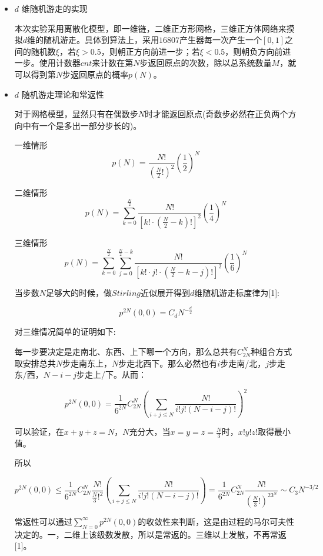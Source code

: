 \documentclass[UTF8]{ctexart}
\begin{document}
	\begin{itemize}
		\item $d$ 维随机游走的实现
		
		本次实验采用离散化模型，即一维链，二维正方形网格，三维正方体网络来摸拟$d$维的随机游走。具体到算法上，采用$16807$产生器每一次产生一个$[0,1]$之间的随机数$\xi$，若$\xi>0.5$，则朝正方向前进一步；若$\xi<0.5$，则朝负方向前进一步。使用计数器$cnt$来计数在第$N$步返回原点的次数，除以总系统数量$M$，就可以得到第$N$步返回原点的概率$p(N)$。
		
		\item $d$ 随机游走理论和常返性
		
		对于网格模型，显然只有在偶数步$N$时才能返回原点(奇数步必然在正负两个方向中有一个是多出一部分步长的)。
		
		\subitem 一维情形
		$$p(N)=\frac{N!}{(\frac{N}{2}!)^2}\left( \frac{1}{2}\right) ^{N}$$
		
		
		\subitem 二维情形
		$$p(N)=\sum_{k=0}^{\frac{N}{2}}\frac{N!}{[k!\cdot(\frac{N}{2}-k)!]^2}\left( \frac{1}{4}\right)^{N}$$
		
		\subitem 三维情形
		$$p(N)=\sum_{k=0}^{\frac{N}{2}}\sum_{j=0}^{\frac{N}{2}-k}\frac{N!}{[k!\cdot j!\cdot(\frac{N}{2}-k-j)!]^2}\left( \frac{1}{6}\right)^{N}$$
		
		当步数$N$足够大的时候，做$Stirling$近似展开得到$d$维随机游走标度律为[1]:
		
		$$p^{2N}(0,0)=C_dN^{-\frac{d}{2}}$$
		
		对三维情况简单的证明如下:
		
		每一步要决定是走南北、东西、上下哪一个方向，那么总共有$C^{N}_{2N}$种组合方式取安排总共$N$步走南东上，$N$步走北西下。那么必然也有$i$步走南/北，$j$步走东/西，$N-i-j$步走上/下。从而：
		
		$$p^{2N}(0,0)=\frac{1}{6^{2N}}C^{N}_{2N}\left( \sum_{i+j\leq N}\frac{N!}{i!j!(N-i-j)!}\right) ^2$$
		
		可以验证，在$x+y+z=N$，$N$充分大，当$x=y=z=\frac{N}{3}$时，$x!y!z!$取得最小值。
		
		所以
		
		$$p^{2N}(0,0)\leq\frac{1}{6^{2N}}C^{N}_{2N}\frac{N!}{\frac{N}{3}!^2}\left( \sum_{i+j\leq N}\frac{N!}{i!j!(N-i-j)!}\right)=\frac{1}{6^{2N}}C^{N}_{2N}\frac{N!}{{(\frac{N}{3}!)}^23^{N}}\sim C_3N^{-3/2}$$
			
		
		
		常返性可以通过$\sum_{N=0}^{\infty}p^{2N}(0,0)$的收敛性来判断，这是由过程的马尔可夫性决定的。一，二维上该级数发散，所以是常返的。三维以上发散，不再常返[1]。
		\end{itemize}
		
\end{document}
